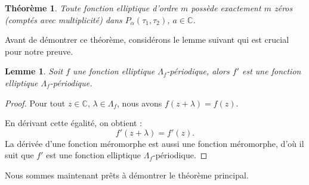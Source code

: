 \documentclass[12pt]{article}
\newtheorem{lemma}{Lemme}
\newtheorem{theorem}{Théorème}
\begin{document}
    \begin{theorem}
        Toute fonction elliptique d'ordre \( m \) possède exactement \( m \) zéros (comptés avec multiplicité) dans \( P_{\alpha}(\tau_1, \tau_2) \), \( a \in \mathbb{C} \).
        \end{theorem}
        Avant de démontrer ce théorème, considérons le lemme suivant qui est crucial pour notre preuve.
        
        \begin{lemma}
        Soit \( f \) une fonction elliptique \( \Lambda_f \)-périodique, alors \( f' \) est une fonction elliptique \( \Lambda_f \)-périodique.
        \end{lemma}
        
        \begin{proof}
        Pour tout \( z \in \mathbb{C} \), \( \lambda \in \Lambda_f \), nous avons \( f(z + \lambda) = f(z) \).
        
        En dérivant cette égalité, on obtient :
        \[ 
        f'(z + \lambda) = f'(z).
        \]
        La dérivée d'une fonction méromorphe est aussi une fonction méromorphe, d'où il suit que \( f' \) est une fonction elliptique \( \Lambda_f \)-périodique.
        \end{proof}
        
        Nous sommes maintenant prêts à démontrer le théorème principal.
        
\end{document}
